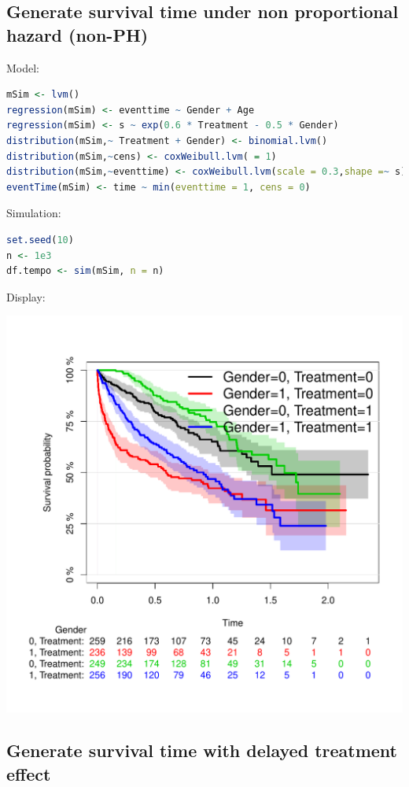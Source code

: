 \documentclass{article}
\begin{document}
\subsection{Generate survival time under non proportional hazard (non-PH)}
\label{sec:org96bd618}

Model:
\begin{lstlisting}[language=r,numbers=none]
mSim <- lvm()
regression(mSim) <- eventtime ~ Gender + Age
regression(mSim) <- s ~ exp(0.6 * Treatment - 0.5 * Gender)
distribution(mSim,~ Treatment + Gender) <- binomial.lvm()
distribution(mSim,~cens) <- coxWeibull.lvm( = 1)
distribution(mSim,~eventtime) <- coxWeibull.lvm(scale = 0.3,shape =~ s)
eventTime(mSim) <- time ~ min(eventtime = 1, cens = 0)
\end{lstlisting}

Simulation:
\begin{lstlisting}[language=r,numbers=none]
set.seed(10)
n <- 1e3
df.tempo <- sim(mSim, n = n)
\end{lstlisting}

Display:
\begin{center}
\includegraphics[width=.9\linewidth]{./figures/fig-nonPH.pdf}
\label{}
\end{center}
\subsection{Generate survival time with delayed treatment effect}
\label{sec:org533f971}
\end{document}
